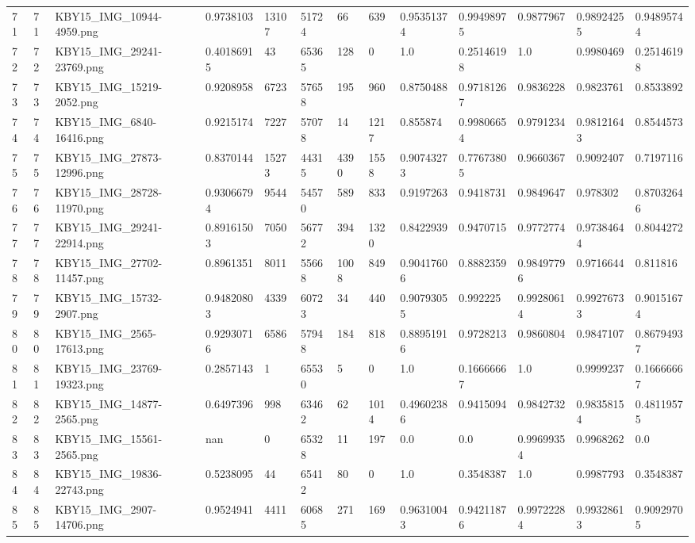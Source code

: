 \documentclass[11pt, a4paper, twoside]{report}
\begin{document}
\begin{longtable}[c]{@{}lllllllllllll@{}}
71 & 71 & KBY15\_IMG\_10944-4959.png & 0.9738103 & 13107 & 51724 & 66 & 639 & 0.95351374 & 0.99498975 & 0.9877967 & 0.98924255 & 0.94895744 \\
72 & 72 & KBY15\_IMG\_29241-23769.png & 0.40186915 & 43 & 65365 & 128 & 0 & 1.0 & 0.25146198 & 1.0 & 0.9980469 & 0.25146198 \\
73 & 73 & KBY15\_IMG\_15219-2052.png & 0.9208958 & 6723 & 57658 & 195 & 960 & 0.8750488 & 0.97181267 & 0.9836228 & 0.9823761 & 0.8533892 \\
74 & 74 & KBY15\_IMG\_6840-16416.png & 0.9215174 & 7227 & 57078 & 14 & 1217 & 0.855874 & 0.99806654 & 0.9791234 & 0.98121643 & 0.8544573 \\
75 & 75 & KBY15\_IMG\_27873-12996.png & 0.8370144 & 15273 & 44315 & 4390 & 1558 & 0.90743273 & 0.77673805 & 0.9660367 & 0.9092407 & 0.7197116 \\
76 & 76 & KBY15\_IMG\_28728-11970.png & 0.93066794 & 9544 & 54570 & 589 & 833 & 0.9197263 & 0.9418731 & 0.9849647 & 0.978302 & 0.87032646 \\
77 & 77 & KBY15\_IMG\_29241-22914.png & 0.89161503 & 7050 & 56772 & 394 & 1320 & 0.8422939 & 0.9470715 & 0.9772774 & 0.97384644 & 0.8044272 \\
78 & 78 & KBY15\_IMG\_27702-11457.png & 0.8961351 & 8011 & 55668 & 1008 & 849 & 0.90417606 & 0.8882359 & 0.98497796 & 0.9716644 & 0.811816 \\
79 & 79 & KBY15\_IMG\_15732-2907.png & 0.94820803 & 4339 & 60723 & 34 & 440 & 0.90793055 & 0.992225 & 0.99280614 & 0.99276733 & 0.90151674 \\
80 & 80 & KBY15\_IMG\_2565-17613.png & 0.92930716 & 6586 & 57948 & 184 & 818 & 0.88951916 & 0.9728213 & 0.9860804 & 0.9847107 & 0.86794937 \\
81 & 81 & KBY15\_IMG\_23769-19323.png & 0.2857143 & 1 & 65530 & 5 & 0 & 1.0 & 0.16666667 & 1.0 & 0.9999237 & 0.16666667 \\
82 & 82 & KBY15\_IMG\_14877-2565.png & 0.6497396 & 998 & 63462 & 62 & 1014 & 0.49602386 & 0.9415094 & 0.9842732 & 0.98358154 & 0.48119575 \\
83 & 83 & KBY15\_IMG\_15561-2565.png & nan & 0 & 65328 & 11 & 197 & 0.0 & 0.0 & 0.99699354 & 0.9968262 & 0.0 \\
84 & 84 & KBY15\_IMG\_19836-22743.png & 0.5238095 & 44 & 65412 & 80 & 0 & 1.0 & 0.3548387 & 1.0 & 0.9987793 & 0.3548387 \\
85 & 85 & KBY15\_IMG\_2907-14706.png & 0.9524941 & 4411 & 60685 & 271 & 169 & 0.96310043 & 0.94211876 & 0.99722284 & 0.99328613 & 0.90929705 \\

\end{longtable}
\end{document}
